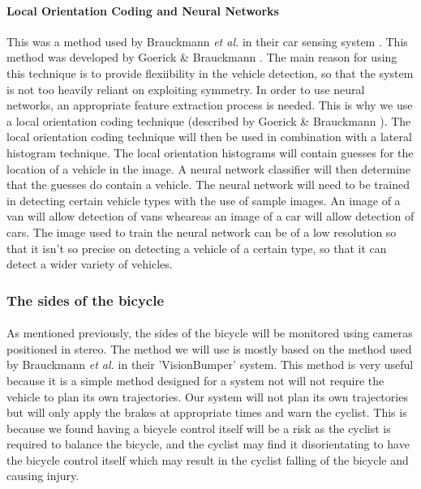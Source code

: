 \documentclass[a4paper]{report}
\begin{document}
{\paragraph{Local Orientation Coding and Neural Networks} This was a method used by Brauckmann \textit{et al.} in their car sensing system \citep{towards_all_around_sensing}. This method was developed by Goerick \& Brauckmann \citep{goerick1994local}. The main reason for using this technique is to provide flexiibility in the vehicle detection, so that the system is not too heavily reliant on exploiting symmetry. In order to use neural networks, an appropriate feature extraction process is needed. This is why we use a local orientation coding technique (described by Goerick \& Brauckmann \citep{goerick1994local}). The local orientation coding technique will then be used in combination with a lateral histogram technique. The local orientation histograms will contain guesses for the location of a vehicle in the image. A neural network classifier will then determine that the guesses do contain a vehicle. The neural network will need to be trained in detecting certain vehicle types with the use of sample images. An image of a van will allow detection of vans wheareas an image of a car will allow detection of cars. The image used to train the neural network can be of a low resolution so that it isn't so precise on detecting a vehicle of a certain type, so that it can detect a wider variety of vehicles.

\subsubsection{The sides of the bicycle}

\paragraph{}As mentioned previously, the sides of the bicycle will be monitored using cameras positioned in stereo. The method we will use is mostly based on the method used by Brauckmann \textit{et al.} \citep{towards_all_around_sensing} in their 'VisionBumper' system. This method is very useful because it is a simple method designed for a system not will not require the vehicle to plan its own trajectories. Our system will not plan its own trajectories but will only apply the brakes at appropriate times and warn the cyclist. This is because we found having a bicycle control itself will be a risk as the cyclist is required to balance the bicycle, and the cyclist may find it disorientating to have the bicycle control itself which may result in the cyclist falling of the bicycle and causing injury. 

}
\end{document}
